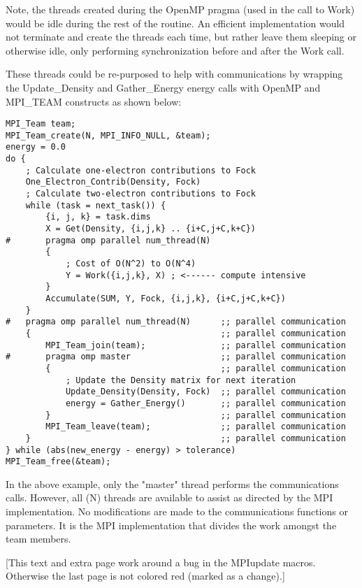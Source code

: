 \begin{example}
{Note, the threads created during the OpenMP pragma (used in the call
to Work) would be idle during the rest of the routine. An efficient
implementation would not terminate and create the threads each time,
but rather leave them sleeping or otherwise idle, only performing
synchronization before and after the Work call.

These threads could be re-purposed to help with communications by
wrapping the Update\_Density and Gather\_Energy energy calls with
OpenMP and MPI\_TEAM constructs as shown below:

\begin{verbatim}
MPI_Team team;
MPI_Team_create(N, MPI_INFO_NULL, &team);
energy = 0.0
do {
    ; Calculate one-electron contributions to Fock
    One_Electron_Contrib(Density, Fock)
    ; Calculate two-electron contributions to Fock
    while (task = next_task()) {
        {i, j, k} = task.dims
        X = Get(Density, {i,j,k} .. {i+C,j+C,k+C})
#       pragma omp parallel num_thread(N)
        {
            ; Cost of O(N^2) to O(N^4)
            Y = Work({i,j,k}, X) ; <------ compute intensive
        }
        Accumulate(SUM, Y, Fock, {i,j,k}, {i+C,j+C,k+C})
    }
#   pragma omp parallel num_thread(N)      ;; parallel communication
    {                                      ;; parallel communication
        MPI_Team_join(team);               ;; parallel communication
#       pragma omp master                  ;; parallel communication
        {                                  ;; parallel communication
            ; Update the Density matrix for next iteration
            Update_Density(Density, Fock)  ;; parallel communication
            energy = Gather_Energy()       ;; parallel communication
        }                                  ;; parallel communication
        MPI_Team_leave(team);              ;; parallel communication
    }                                      ;; parallel communication
} while (abs(new_energy - energy) > tolerance)
MPI_Team_free(&team);
\end{verbatim}

In the above example, only the "master" thread performs the communications calls.
However, all (N) threads are available to assist as directed by the MPI implementation.
No modifications are made to the communications functions or parameters.
It is the MPI implementation that divides the work amongst the team members.


}
\end{example}

\newpage


[This text and extra page work around a bug in the MPIupdate macros. Otherwise
the last page is not colored red (marked as a change).]
